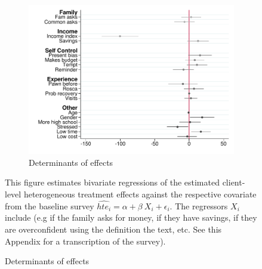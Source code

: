 \documentclass[oneside,11pt]{article}
\begin{document}
\begin{figure}[H]
    \caption{Heterogeneous Treatment Effect: Fee-forcing contract}
    \label{HTE_fee_forcing}
    \begin{center}
    \begin{subfigure}{0.7\textwidth}
        \caption{Determinants of effects}
        \centering
        \includegraphics[width=\textwidth]{Figuras/HE/he_int_vertical_fc_admin_disc_pro_2.pdf}
    \end{subfigure}
    
    \end{center}
     \scriptsize  This figure estimates bivariate regressions of the estimated client-level heterogeneous treatment effects against the respective covariate from the baseline survey  $\widehat{hte_i} = \alpha + \beta \: X_i + \epsilon_i$. The regressors $X_i$ include (e.g if the family asks for money, if they have savings, if they are overconfident using the definition the text, etc. See this Appendix for a transcription of the survey).
\end{figure}
\end{document}
